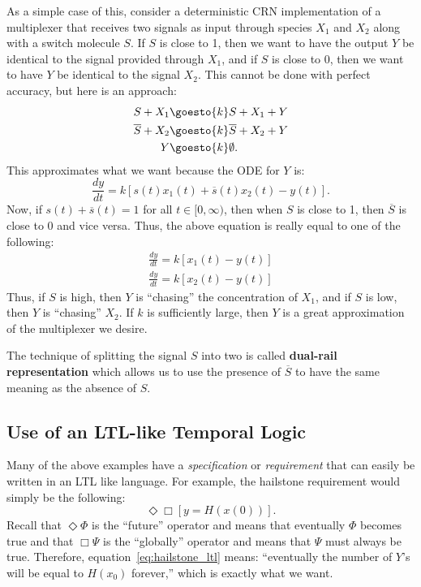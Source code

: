 As a simple case of this, consider a deterministic CRN implementation of a multiplexer that receives two signals as input through species \( X_1 \) and \( X_2 \) along with a switch molecule \( S \).
If \( S \) is close to 1, then we want to have the output \( Y \) be identical to the signal provided through \( X_1 \), and if \( S \) is close to 0, then we want to have \( Y \) be identical to the signal \( X_2 \).
This cannot be done with perfect accuracy, but here is an approach:
\begin{align}
    S + X_1 &\goesto{k} S + X_1 + Y\\
    \overline{S} + X_2 &\goesto{k} \overline{S} + X_2 + Y\\
    Y &\goesto{k} \emptyset.
\end{align}
This approximates what we want because the ODE for \( Y \) is:
\begin{equation}
    \frac{dy}{dt} = k\left[s(t)x_1(t) + \overline{s}(t)x_2(t) - y(t)\right].
\end{equation}
Now, if \( s(t) + \overline{s}(t) = 1 \) for all \( t\in[0,\infty) \), then when \( S \) is close to 1, then \( \overline{S} \) is close to 0 and vice versa.
Thus, the above equation is really equal to one of the following:
\begin{align}
    \frac{dy}{dt} = k\left[x_1(t) - y(t)\right]\\
    \frac{dy}{dt} = k\left[x_2(t) - y(t)\right]
\end{align}
Thus, if \( S \) is high, then \( Y \) is ``chasing'' the concentration of \( X_1 \), and if \( S \) is low, then \( Y \) is ``chasing'' \( X_2 \).
If \( k \) is sufficiently large, then \( Y \) is a great approximation of the multiplexer we desire.

The technique of splitting the signal \( S \) into two is called \textbf{dual-rail representation} which allows us to use the presence of \( \overline{S} \) to have the same meaning as the absence of \( S \).

\subsection{Use of an LTL-like Temporal Logic}
Many of the above examples have a \emph{specification} or \emph{requirement} that can easily be written in an LTL like language.
For example, the hailstone requirement would simply be the following:
\begin{equation}\label{eq:hailstone_ltl}
    \Diamond\Box\left[y = H(x(0))\right].
\end{equation}
Recall that \( \Diamond\Phi \) is the ``future'' operator and means that eventually \( \Phi \) becomes true and that \( \Box\Psi \) is the ``globally'' operator and means that \( \Psi \) must always be true.
Therefore, equation~\eqref{eq:hailstone_ltl} means: ``eventually the number of \( Y \)'s will be equal to \( H(x_0) \) forever,'' which is exactly what we want.

